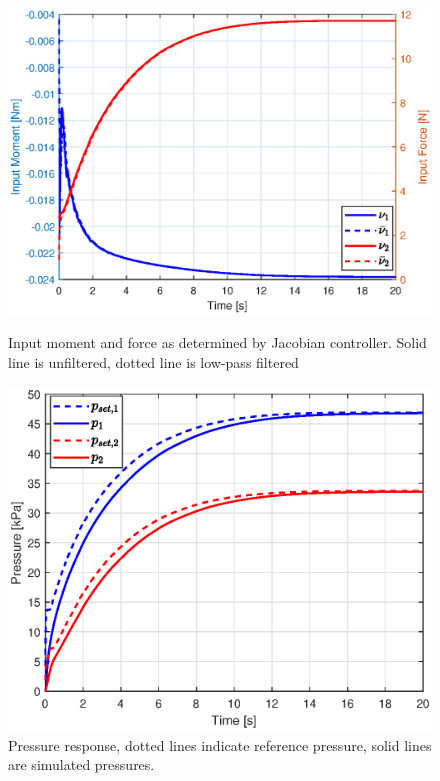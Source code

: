 \begin{figure}[H]
\centering
\begin{minipage}{0.5\textwidth}
        \centering
        \includegraphics[width=\textwidth]{Figures/Chapter5/forcemomentsim.eps} 
        \caption{Input moment and force as determined by Jacobian controller. Solid line is unfiltered, dotted line is low-pass filtered}
        \label{fig5:inputsim}

    \end{minipage}\hfill
    \begin{minipage}{0.5\textwidth}
        \centering
        \includegraphics[width=\textwidth]{Figures/Chapter5/pressuresim.eps}
        \caption{Pressure response, dotted lines indicate reference pressure, solid lines are simulated pressures.}
        \label{fig5:pressuresim}
    \end{minipage}
\end{figure}




